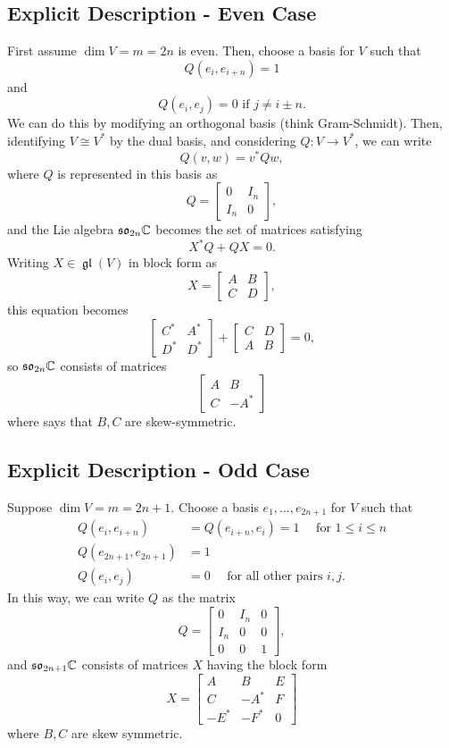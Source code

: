 \documentclass[12pt]{article}
\newcommand{\gl}{\operatorname{\mathfrak{gl}}}
\newcommand{\so}{\mathfrak{so}}
\begin{document}
\subsection{Explicit Description - Even Case}
First assume $\dim V = m = 2n$ is even. Then, choose a basis for $V$ such that
\[Q(e_i,e_{i+n}) = 1\]
and
\[Q(e_i,e_j)=0 \text{ if } j\neq i\pm n.\]
We can do this by modifying an orthogonal basis (think Gram-Schmidt). Then, identifying $V\cong V^*$ by the dual basis, and considering $Q: V\to V^*$, we can write
\[Q(v,w) = v^* Q w,\]
where $Q$ is represented in this basis as
\[Q = \begin{bmatrix}
    0 & I_n\\
    I_n & 0
\end{bmatrix},\]
and the Lie algebra $\so_{2n} \C$ becomes the set of matrices satisfying
\[X^* Q + Q X = 0.\]
Writing $X \in \gl(V)$ in block form as
\[X = \begin{bmatrix}
    A & B\\
    C & D
\end{bmatrix},\]
this equation becomes
\[\begin{bmatrix}
    C^* & A^*\\
    D^* & D^*
\end{bmatrix} + \begin{bmatrix}
    C & D\\
    A & B
\end{bmatrix} = 0,\]
so $\so_{2n} \C$ consists of matrices
\[\begin{bmatrix}
    A & B\\
    C & -A^*
\end{bmatrix}\]
where says that $B,C$ are skew-symmetric.

\subsection{Explicit Description - Odd Case}
Suppose $\dim V = m = 2n+1$. Choose a basis $e_1,\dots,e_{2n+1}$ for $V$ such that
\begin{align*}
    Q(e_i, e_{i+n}) &= Q(e_{i+n},e_i)=1 \quad \text{ for } 1\leq i \leq n\\
    Q(e_{2n+1},e_{2n+1}) &= 1\\
    Q(e_i,e_j) &=0 \quad \text{ for all other pairs } i,j.
\end{align*}
In this way, we can write $Q$ as the matrix
\[Q = \begin{bmatrix}
    0 & I_n & 0\\
    I_n & 0 & 0\\
    0 & 0 & 1
\end{bmatrix},\]
and $\so_{2n+1} \C$ consists of matrices $X$ having the block form
\[X = \begin{bmatrix}
    A & B & E\\
    C & -A^* & F\\
    -E^* & -F^* & 0
\end{bmatrix}\]
where $B,C$ are skew symmetric.
\end{document}
